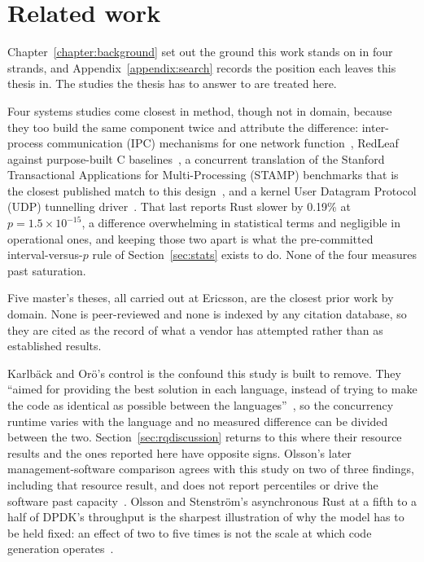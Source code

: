 \section{Related work}\label{sec:relatedwork}
Chapter~\ref{chapter:background} set out the ground this work stands on in four strands, and
Appendix~\ref{appendix:search} records the position each leaves this thesis in. The studies the
thesis has to answer to are treated here.

Four systems studies come closest in method, though not in domain, because they too build the
same component twice and attribute the difference: inter-process communication (IPC) mechanisms
for one network function~\cite{li2021ipc}, RedLeaf against purpose-built C
baselines~\cite{narayanan2020redleaf}, a concurrent translation of the Stanford Transactional
Applications for Multi-Processing (STAMP) benchmarks that is the closest published match to this
design~\cite{suchert2023stamp}, and a kernel User Datagram Protocol (UDP) tunnelling
driver~\cite{gonzalez2023rustudp}. That last reports Rust slower by 0.19\% at $p = 1.5 \times
10^{-15}$, a difference overwhelming in statistical terms and negligible in operational ones, and
keeping those two apart is what the pre-committed interval-versus-$p$ rule of
Section~\ref{sec:stats} exists to do. None of the four measures past saturation.

Five master's theses, all carried out at Ericsson, are the closest prior work by domain. None is
peer-reviewed and none is indexed by any citation database, so they are cited as the record of
what a vendor has attempted rather than as established results.

Karlb\"ack and Or\"o's control is the confound this study is built to remove. They ``aimed for
providing the best solution in each language, instead of trying to make the code as identical as
possible between the languages''~\cite{karlback2021ran}, so the concurrency runtime varies with
the language and no measured difference can be divided between the two.
Section~\ref{sec:rqdiscussion} returns to this where their resource results and the ones reported
here have opposite signs. Olsson's later management-software comparison agrees with this study on
two of three findings, including that resource result, and does not report percentiles or drive
the software past capacity~\cite{olsson2023ranmgmt}. Olsson and Stenstr\"om's asynchronous Rust at
a fifth to a half of DPDK's throughput is the sharpest illustration of why the model has to be
held fixed: an effect of two to five times is not the scale at which code generation
operates~\cite{olsson2023asyncpackets}.

